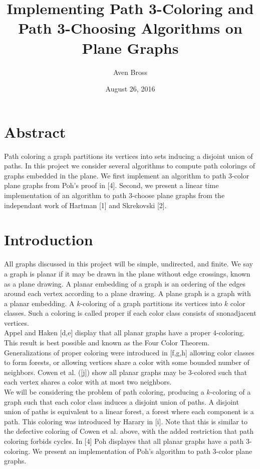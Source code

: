 \documentclass[11pt,letter]{article}
\begin{document}
\title{Implementing Path 3-Coloring and Path 3-Choosing Algorithms on Plane Graphs}
\author{Aven Bross}
\date{August 26, 2016}

\maketitle

\section*{Abstract}

Path coloring a graph partitions its vertices into sets inducing a disjoint union of paths. In this project
we consider several algorithms to compute path colorings of graphs embedded in the plane. We
first implement an algorithm to path 3-color plane graphs from Poh's proof in [4]. Second, we present a linear time
implementation of an algorithm to path 3-choose plane graphs from the independant work of Hartman [1] and
Skrekovski [2].

\section{Introduction}

All graphs discussed in this project will be simple, undirected, and finite. We say a graph is planar if it may
be drawn in the plane without edge crossings, known as a plane drawing. A planar embedding of a graph is an
ordering of the edges around each vertex according to a plane drawing. A plane graph is a graph with a
planar embedding.
A $k$-coloring of a graph partitions its vertices into $k$ color classes. Such a coloring is called proper
if each color class consists of snonadjacent vertices.\\

\noindent Appel and Haken [d,e] display that all planar graphs have a proper $4$-coloring.
This result is best possible and known as the Four Color Theorem.
Generalizations of proper coloring were introduced in [f,g,h] allowing color classes to form forests, or allowing
vertices share a color with some bounded number of neighbors. Cowen et al. ([j]) show all planar
graphs may be $3$-colored such that each vertex shares a color with at most two neighbors.\\

\noindent We will be considering the problem of path coloring, producing a $k$-coloring of a graph such that each color
class induces a disjoint union of paths. A disjoint union of paths is equivalent to a linear forest, a forest
where each component is a path. This coloring
was introduced by Harary in [i]. Note that this is similar to the defective coloring of Cowen et al. above,
with the added restriction that path coloring forbids cycles. In [4] Poh displayes that all
planar graphs have a path $3$-coloring. We present an implementation of Poh's algorithm to path
$3$-color plane graphs.\\
\end{document}
